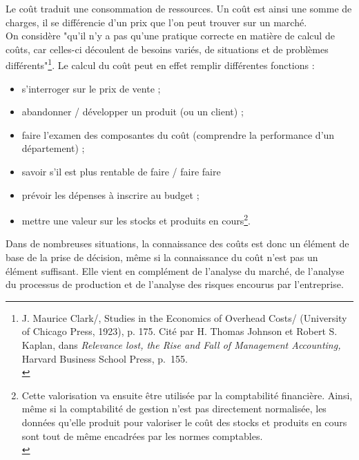 \documentclass{tufte-handout}
\begin{document}
Le coût traduit une consommation de ressources. Un coût est ainsi une somme de charges, il se différencie d'un prix que l'on peut trouver sur un marché.\\
On considère "qu'il n'y a pas qu'une pratique correcte en matière de calcul de coûts, car celles-ci découlent de besoins variés, de situations et de problèmes différents"\footnote{J. Maurice Clark/, Studies in the Economics of Overhead Costs/ (University of Chicago Press, 1923), p. 175. Cité par H. Thomas Johnson et Robert S. Kaplan, dans \emph{Relevance lost, the Rise and Fall of Management Accounting,} Harvard Business School Press, p. 155.\\}. Le calcul du coût peut en effet remplir différentes fonctions :\\
\begin{itemize}
\item s’interroger sur le prix de vente ;\\
\item abandonner / développer un produit (ou un client) ;\\
\item faire l’examen des composantes du coût (comprendre la performance d’un département) ;\\
\item savoir s’il est plus rentable de faire / faire faire\\
\item prévoir les dépenses à inscrire au budget ;\\
\item mettre une valeur sur les stocks et produits en cours\footnote{Cette valorisation va ensuite être utilisée par la comptabilité financière. Ainsi, même si la comptabilité de gestion n'est pas directement normalisée, les données qu'elle produit pour valoriser le coût des stocks et produits en cours sont tout de même encadrées par les normes comptables.\\}.\\
\end{itemize}

Dans de nombreuses situations, la connaissance des coûts est donc un élément de base de la prise de décision, même si la connaissance du coût n'est pas un élément suffisant. Elle vient en complément de l'analyse du marché, de l'analyse du processus de production et de l'analyse des risques encourus par l'entreprise.\\
\end{document}
